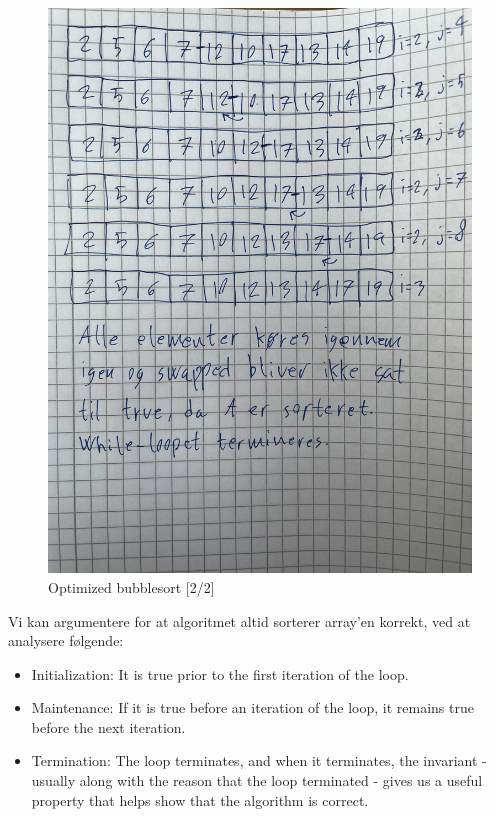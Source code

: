 \documentclass[a4paper,12pt]{article}
\begin{document}
\begin{figure}[H]
    \centering
    \includegraphics[width=1.08\textwidth, angle=-90]{IMG_2073.jpg}
    \caption{Optimized bubblesort [2/2]}
\end{figure}

Vi kan argumentere for at algoritmet altid sorterer array'en korrekt, ved at analysere følgende:
\begin{itemize}
    \item Initialization: It is true prior to the first iteration of the loop.
    \item Maintenance: If it is true before an iteration of the loop, it remains true before the next iteration.
    \item Termination: The loop terminates, and when it terminates, the invariant - usually along with the reason that the loop terminated - gives us a useful property that helps show that the algorithm is correct.
\end{itemize}
\end{document}
